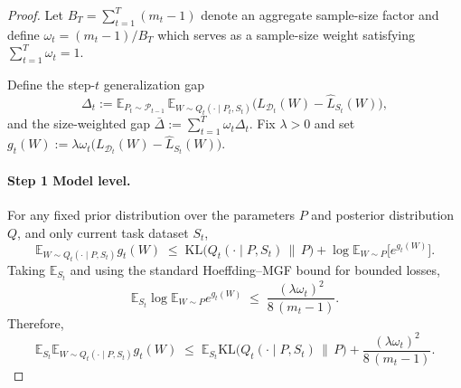 \documentclass{article}
\theoremstyle{plain}
\theoremstyle{definition}
\theoremstyle{remark}
\begin{document}
\begin{proof}
    


Let $B_T=\sum_{t=1}^T (m_t-1)$ denote an aggregate sample-size factor and define $\omega_t=(m_t-1)/B_T$ which serves as a sample-size weight satisfying $\sum_{t=1}^T\omega_t=1$.



Define the step-$t$ generalization gap
\[
\Delta_t
:=\mathbb E_{P_t\sim\mathcal P_{t-1}}\,
\mathbb E_{W\sim Q_t(\cdot\mid P_t,S_t)}
\big(L_{\mathcal D_t}(W)-\hat L_{S_t}(W)\big),
\]
and the size-weighted gap $\bar\Delta:=\sum_{t=1}^T \omega_t \Delta_t$.
Fix $\lambda>0$ and set
\(
g_t(W):=\lambda\omega_t\big(L_{\mathcal D_t}(W)-\hat L_{S_t}(W)\big).
\)

\paragraph{Step 1 Model level.}
For any fixed prior distribution over the parameters $P$ and posterior distribution $Q$, and only current task dataset $S_t$,   
\begin{equation}
\label{eq:dv-w}
\mathbb E_{W\sim Q_t(\cdot\mid P,S_t)} g_t(W)
\;\le\;
\mathrm{KL}\!\big(Q_t(\cdot\mid P,S_t)\,\|\,P\big)
+\log\mathbb E_{W\sim P}\!\big[e^{g_t(W)}\big].
\end{equation}
Taking $\mathbb E_{S_t}$ and using the standard Hoeffding--MGF bound for bounded losses,
\begin{equation}
\label{eq:mgf-mean-gap}
\mathbb E_{S_t}\log\mathbb E_{W\sim P} e^{g_t(W)}
\;\le\; \frac{(\lambda\omega_t)^2}{8\,(m_t-1)}.
\end{equation}
Therefore,
\begin{equation}
\label{eq:model-step}
\mathbb E_{S_t}\mathbb E_{W\sim Q_t(\cdot\mid P,S_t)} g_t(W)
\;\le\;
\mathbb E_{S_t}\mathrm{KL}\!\big(Q_t(\cdot\mid P,S_t)\,\|\,P\big)
+\frac{(\lambda\omega_t)^2}{8\,(m_t-1)}.
\end{equation}

\end{proof}
\end{document}
